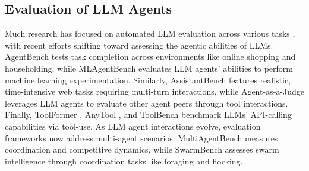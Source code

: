 \documentclass{article}
\begin{document}
\subsection{Evaluation of LLM Agents}
Much research has focused on automated LLM evaluation across various tasks \cite{fu2023gptscore,liu2023g,li2023alpacaeval}, with recent efforts shifting toward assessing the agentic abilities of LLMs. AgentBench \cite{liu2023agentbench} tests task completion across environments like online shopping and householding, while MLAgentBench \cite{huang2023mlagentbench} evaluates LLM agents' abilities to perform machine learning experimentation. Similarly, AssistantBench \cite{yoran2024assistantbench} features realistic, time-intensive web tasks requiring multi-turn interactions, while Agent-as-a-Judge \cite{zhuge2024agent} leverages LLM agents to evaluate other agent peers through tool interactions. Finally, ToolFormer \cite{schick2023toolformer}, AnyTool \cite{du2024anytool}, and ToolBench \cite{qin2023toolllm} benchmark LLMs' API-calling capabilities via tool-use. As LLM agent interactions evolve, evaluation frameworks now address multi-agent scenarios: MultiAgentBench \cite{zhu2025multiagentbench} measures coordination and competitive dynamics, while SwarmBench \cite{ruan2025benchmarking} assesses swarm intelligence through coordination tasks like foraging and flocking.
\end{document}
